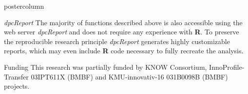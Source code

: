 \documentclass[final]{beamer}\usepackage[]{graphicx}\usepackage[]{color}
\begin{document}
\begin{frame}
\begin{columns}
\begin{column}{.54\textwidth}
\begin{beamercolorbox}[center,wd=\textwidth]{postercolumn}
\begin{minipage}[T]{.95\textwidth}
{\begin{block}{\textit{dpcReport}}
The majority of functions described above is also accessible using the web server \textit{dpcReport} and does not require any experience with \textbf{R}. To preserve the reproducible research principle \textit{dpcReport} generates highly customizable reports, which may even include \textbf{R} code necessary to fully recreate the analysis.

\end{block}
\vfill

\begin{block}{Funding}
\footnotesize{
This research was partially funded by KNOW Consortium, InnoProfile-Transfer 03IPT611X (BMBF) and 
KMU-innovativ-16 031B0098B (BMBF) projects.
}
\end{block}
\vfill 

}
\end{minipage}
\end{beamercolorbox}
\end{column}
\end{columns}  
\end{frame}
\end{document}
